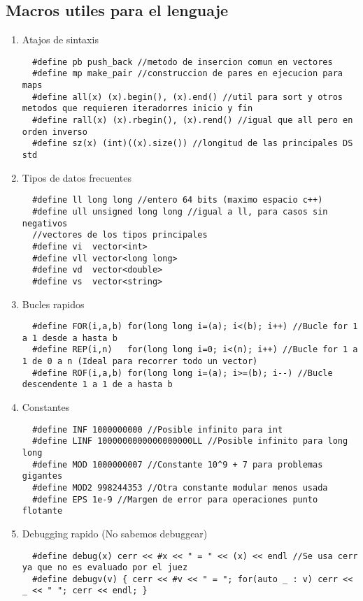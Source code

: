 \documentclass[11pt,a4paper]{article}
\begin{document}
\subsection{Macros utiles para el lenguaje}
\begin{enumerate} [label=\alph*.]
  \item Atajos de sintaxis
\begin{lstlisting}
  #define pb push_back //metodo de insercion comun en vectores
  #define mp make_pair //construccion de pares en ejecucion para maps
  #define all(x) (x).begin(), (x).end() //util para sort y otros metodos que requieren iteradorres inicio y fin
  #define rall(x) (x).rbegin(), (x).rend() //igual que all pero en orden inverso
  #define sz(x) (int)((x).size()) //longitud de las principales DS std
\end{lstlisting}
  \item Tipos de datos frecuentes
\begin{lstlisting}
  #define ll long long //entero 64 bits (maximo espacio c++)
  #define ull unsigned long long //igual a ll, para casos sin negativos
  //vectores de los tipos principales
  #define vi  vector<int>
  #define vll vector<long long>
  #define vd  vector<double>
  #define vs  vector<string>
\end{lstlisting}
  \item Bucles rapidos
\begin{lstlisting}
  #define FOR(i,a,b) for(long long i=(a); i<(b); i++) //Bucle for 1 a 1 desde a hasta b
  #define REP(i,n)   for(long long i=0; i<(n); i++) //Bucle for 1 a 1 de 0 a n (Ideal para recorrer todo un vector)
  #define ROF(i,a,b) for(long long i=(a); i>=(b); i--) //Bucle descendente 1 a 1 de a hasta b
\end{lstlisting}
  \item Constantes
\begin{lstlisting}
  #define INF 1000000000 //Posible infinito para int 
  #define LINF 1000000000000000000LL //Posible infinito para long long
  #define MOD 1000000007 //Constante 10^9 + 7 para problemas gigantes
  #define MOD2 998244353 //Otra constante modular menos usada
  #define EPS 1e-9 //Margen de error para operaciones punto flotante
\end{lstlisting}
  \item Debugging rapido (No sabemos debuggear)
\begin{lstlisting}
  #define debug(x) cerr << #x << " = " << (x) << endl //Se usa cerr ya que no es evaluado por el juez
  #define debugv(v) { cerr << #v << " = "; for(auto _ : v) cerr << _ << " "; cerr << endl; }
\end{lstlisting}
\end{enumerate}
\end{document}
